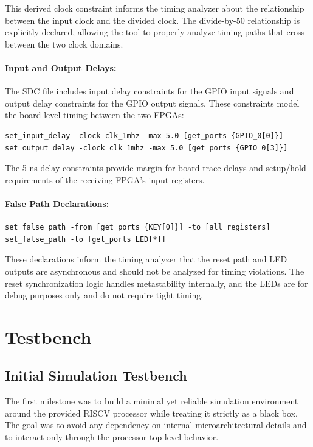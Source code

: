 \documentclass[12pt]{article}
\begin{document}
This derived clock constraint informs the timing analyzer about the relationship between the input clock and the divided clock. The divide-by-50 relationship is explicitly declared, allowing the tool to properly analyze timing paths that cross between the two clock domains.

\paragraph{Input and Output Delays:}
The SDC file includes input delay constraints for the GPIO input signals and output delay constraints for the GPIO output signals. These constraints model the board-level timing between the two FPGAs:

\begin{verbatim}
set_input_delay -clock clk_1mhz -max 5.0 [get_ports {GPIO_0[0]}]
set_output_delay -clock clk_1mhz -max 5.0 [get_ports {GPIO_0[3]}]
\end{verbatim}

The 5 ns delay constraints provide margin for board trace delays and setup/hold requirements of the receiving FPGA's input registers.

\paragraph{False Path Declarations:}
\begin{verbatim}
set_false_path -from [get_ports {KEY[0]}] -to [all_registers]
set_false_path -to [get_ports LED[*]]
\end{verbatim}

These declarations inform the timing analyzer that the reset path and LED outputs are asynchronous and should not be analyzed for timing violations. The reset synchronization logic handles metastability internally, and the LEDs are for debug purposes only and do not require tight timing.

\FloatBarrier 
\section{Testbench}
\subsection{Initial Simulation Testbench}
The first milestone was to build a minimal yet reliable simulation environment around the provided RISCV processor while treating it strictly as a black box. The goal was to avoid any dependency on internal microarchitectural details and to interact only through the processor top level behavior. 
\end{document}
